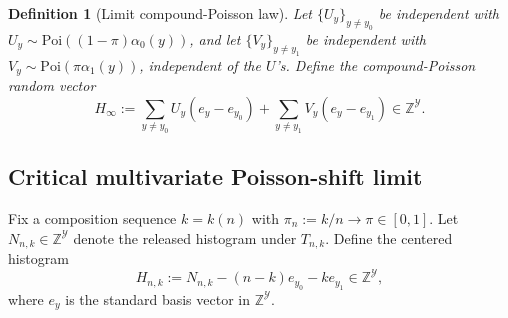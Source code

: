 \documentclass{article}
\newtheorem{definition}[theorem]{Definition}
\begin{document}
\begin{definition}[Limit compound-Poisson law]
\label{def:limit-compound-poisson}
Let $\{U_y\}_{y \neq y_0}$ be independent with $U_y \sim \mathrm{Poi}((1-\pi)\alpha_0(y))$, and let $\{V_y\}_{y \neq y_1}$
be independent with $V_y \sim \mathrm{Poi}(\pi\alpha_1(y))$, independent of the $U$'s. Define
the compound-Poisson random vector
\begin{equation}
H_\infty := \sum_{y \neq y_0} U_y(e_y - e_{y_0}) + \sum_{y \neq y_1} V_y(e_y - e_{y_1}) \in \mathbb{Z}^{\mathcal{Y}}. \label{eq:Hinf}
\end{equation}
\end{definition}

\subsection{Critical multivariate Poisson-shift limit}

Fix a composition sequence $k = k(n)$ with $\pi_n := k/n \to \pi \in [0,1]$. Let $N_{n,k} \in \mathbb{Z}^{\mathcal{Y}}$ denote the
released histogram under $T_{n,k}$. Define the centered histogram
\begin{equation}
H_{n,k} := N_{n,k} - (n-k) e_{y_0} - k e_{y_1} \in \mathbb{Z}^{\mathcal{Y}}, \label{eq:Hnk}
\end{equation}
where $e_y$ is the standard basis vector in $\mathbb{Z}^{\mathcal{Y}}$.
\end{document}
